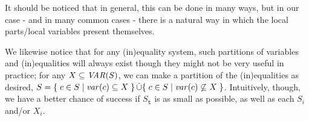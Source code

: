 It should be noticed that in general, this can be done in many ways, but in our case - and in many common cases - there is a natural way in which the local parts/local variables present themselves. %
   
We likewise notice that for any (in)equality system, such partitions of variables and (in)equalities will always exist though they might not be very useful in practice; 
for any $X\subseteq \mathit{VAR}(S)$, we can make a partition of the (in)equalities as desired, $S = \{\;{c\in S}\;|\;{\mathit{var}(c)\subseteq X}\;\}\,\dot\cup \{\;{c\in S}\;|\;{\mathit{var}(c)\not\subseteq X}\;\}$.
Intuitively, though, we have a better chance of success if $S_\texttt{t}$ is as small as possible, as well as each $S_i$ and/or $X_i$.

